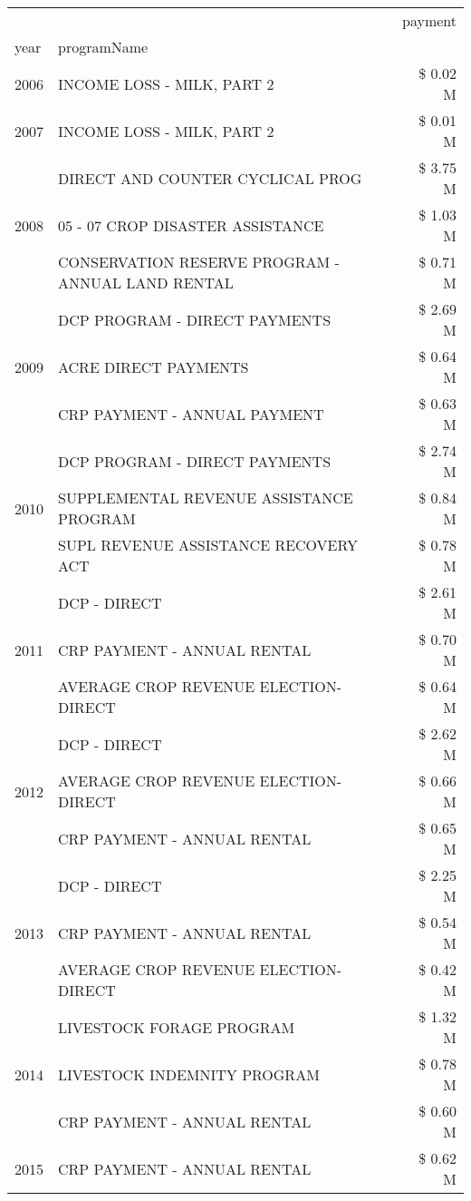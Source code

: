 \begin{tabular}{llr}
\toprule
 &  & payment \\
year & programName &  \\
\midrule
2006 & INCOME LOSS - MILK, PART 2 & \$ 0.02 M \\
\cline{1-3}
2007 & INCOME LOSS - MILK, PART 2 & \$ 0.01 M \\
\cline{1-3}
\multirow[t]{3}{*}{2008} & DIRECT AND COUNTER CYCLICAL PROG & \$ 3.75 M \\
 & 05 - 07 CROP DISASTER ASSISTANCE & \$ 1.03 M \\
 & CONSERVATION RESERVE PROGRAM - ANNUAL LAND RENTAL & \$ 0.71 M \\
\cline{1-3}
\multirow[t]{3}{*}{2009} & DCP PROGRAM - DIRECT PAYMENTS & \$ 2.69 M \\
 & ACRE DIRECT PAYMENTS & \$ 0.64 M \\
 & CRP PAYMENT - ANNUAL PAYMENT & \$ 0.63 M \\
\cline{1-3}
\multirow[t]{3}{*}{2010} & DCP PROGRAM - DIRECT PAYMENTS & \$ 2.74 M \\
 & SUPPLEMENTAL REVENUE ASSISTANCE PROGRAM & \$ 0.84 M \\
 & SUPL REVENUE ASSISTANCE RECOVERY ACT & \$ 0.78 M \\
\cline{1-3}
\multirow[t]{3}{*}{2011} & DCP - DIRECT & \$ 2.61 M \\
 & CRP PAYMENT - ANNUAL RENTAL & \$ 0.70 M \\
 & AVERAGE CROP REVENUE ELECTION-DIRECT & \$ 0.64 M \\
\cline{1-3}
\multirow[t]{3}{*}{2012} & DCP - DIRECT & \$ 2.62 M \\
 & AVERAGE CROP REVENUE ELECTION-DIRECT & \$ 0.66 M \\
 & CRP PAYMENT - ANNUAL RENTAL & \$ 0.65 M \\
\cline{1-3}
\multirow[t]{3}{*}{2013} & DCP - DIRECT & \$ 2.25 M \\
 & CRP PAYMENT - ANNUAL RENTAL & \$ 0.54 M \\
 & AVERAGE CROP REVENUE ELECTION-DIRECT & \$ 0.42 M \\
\cline{1-3}
\multirow[t]{3}{*}{2014} & LIVESTOCK FORAGE PROGRAM & \$ 1.32 M \\
 & LIVESTOCK INDEMNITY PROGRAM & \$ 0.78 M \\
 & CRP PAYMENT - ANNUAL RENTAL & \$ 0.60 M \\
\cline{1-3}
\multirow[t]{3}{*}{2015} & CRP PAYMENT - ANNUAL RENTAL & \$ 0.62 M \\

\end{tabular}
